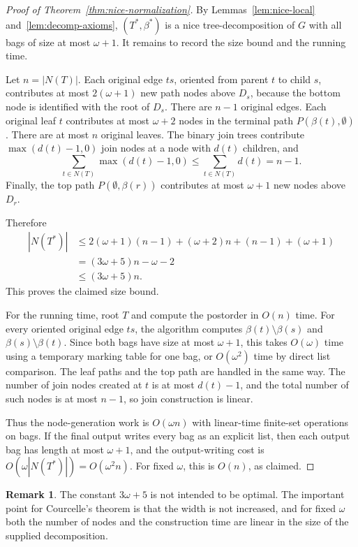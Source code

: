 \documentclass[11pt]{article}
\theoremstyle{definition}
\newtheorem*{remark}{Remark}
\newcommand{\Nodes}{N}
\begin{document}
\begin{proof}[Proof of Theorem~\ref{thm:nice-normalization}]
By Lemmas~\ref{lem:nice-local} and~\ref{lem:decomp-axioms},
\((T^\ast,\beta^\ast)\) is a nice tree-decomposition of \(G\) with all bags of
size at most \(\omega+1\).  It remains to record the size bound and the running
time.

Let \(n=|\Nodes(T)|\).  Each original edge \(ts\), oriented from parent \(t\)
to child \(s\), contributes at most \(2(\omega+1)\) new path nodes above
\(D_s\), because the bottom node is identified with the root of \(D_s\).
There are \(n-1\) original edges.  Each original leaf \(t\) contributes at most
\(\omega+2\) nodes in the terminal path \(P(\beta(t),\emptyset)\).  There are
at most \(n\) original leaves.  The binary join trees contribute
\(\max(d(t)-1,0)\) join nodes at a node with \(d(t)\) children, and
\[
  \sum_{t\in\Nodes(T)}\max(d(t)-1,0)
  \le \sum_{t\in\Nodes(T)} d(t)
  =n-1.
\]
Finally, the top path \(P(\emptyset,\beta(r))\) contributes at most
\(\omega+1\) new nodes above \(D_r\).

Therefore
\[
\begin{aligned}
  |\Nodes(T^\ast)|
  &\le 2(\omega+1)(n-1)+(\omega+2)n+(n-1)+(\omega+1) \\
  &= (3\omega+5)n-\omega-2 \\
  &\le (3\omega+5)n.
\end{aligned}
\]
This proves the claimed size bound.

For the running time, root \(T\) and compute the postorder in \(O(n)\) time.
For every oriented original edge \(ts\), the algorithm computes
\(\beta(t)\setminus\beta(s)\) and \(\beta(s)\setminus\beta(t)\).  Since both
bags have size at most \(\omega+1\), this takes \(O(\omega)\) time using a
temporary marking table for one bag, or \(O(\omega^2)\) time by direct list
comparison.  The leaf paths and the top path are handled in the same way.
The number of join nodes created at \(t\) is at most \(d(t)-1\), and the total
number of such nodes is at most \(n-1\), so join construction is linear.

Thus the node-generation work is \(O(\omega n)\) with linear-time finite-set
operations on bags.  If the final output writes every bag as an explicit list,
then each output bag has length at most \(\omega+1\), and the output-writing
cost is \(O(\omega|\Nodes(T^\ast)|)=O(\omega^2 n)\).  For fixed \(\omega\), this
is \(O(n)\), as claimed.
\end{proof}

\begin{remark}
The constant \(3\omega+5\) is not intended to be optimal.  The important point
for Courcelle's theorem is that the width is not increased, and for fixed
\(\omega\) both the number of nodes and the construction time are linear in the
size of the supplied decomposition.
\end{remark}
\end{document}
